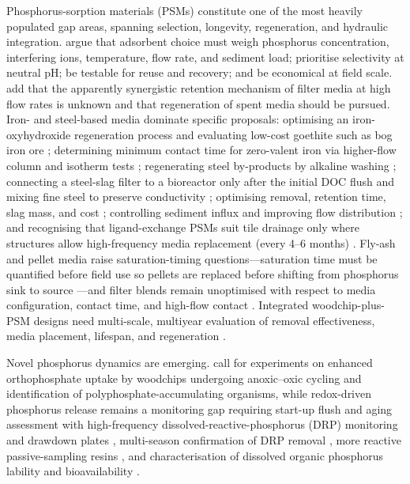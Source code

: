 Phosphorus-sorption materials (PSMs) constitute one of the most heavily populated
gap areas, spanning selection, longevity, regeneration, and hydraulic
integration. \textcite{Li2020} argue that adsorbent choice must weigh phosphorus
concentration, interfering ions, temperature, flow rate, and sediment load;
prioritise selectivity at neutral pH; be testable for reuse and recovery; and be
economical at field scale. \textcite{Mendes2022} add that the apparently
synergistic retention mechanism of filter media at high flow rates is unknown and
that regeneration of spent media should be pursued. Iron- and steel-based media
dominate specific proposals: optimising an iron-oxyhydroxide regeneration process
and evaluating low-cost goethite such as bog iron ore \parencite{Allred2017};
determining minimum contact time for zero-valent iron via higher-flow column and
isotherm tests \parencite{Allred2014}; regenerating steel by-products by alkaline
washing \parencite{Hua2016}; connecting a steel-slag filter to a bioreactor only
after the initial DOC flush and mixing fine steel to preserve conductivity
\parencite{Sellner2019b}; optimising removal, retention time, slag mass, and cost
\parencite{Wang2020d}; controlling sediment influx and improving flow
distribution \parencite{Shedekar2020}; and recognising that ligand-exchange PSMs
suit tile drainage only where structures allow high-frequency media replacement
(every 4--6 months) \parencite{Penn2020}. Fly-ash and pellet media raise
saturation-timing questions---saturation time must be quantified before field use
so pellets are replaced before shifting from phosphorus sink to source
\parencite{Li2017,Li2018b}---and filter blends remain unoptimised with respect to
media configuration, contact time, and high-flow contact
\parencite{Agrawal2011,Agrawal2011b,Kumari2025,Kankarej2023}. Integrated
woodchip-plus-PSM designs need multi-scale, multiyear evaluation of removal
effectiveness, media placement, lifespan, and regeneration \parencite{Husk2018}.

Novel phosphorus dynamics are emerging. \textcite{Zhang2024b} call for
experiments on enhanced orthophosphate uptake by woodchips undergoing
anoxic--oxic cycling and identification of polyphosphate-accumulating organisms,
while redox-driven phosphorus release remains a monitoring gap requiring start-up
flush and aging assessment with high-frequency dissolved-reactive-phosphorus
(DRP) monitoring and drawdown plates \parencite{Bailon2025}, multi-season
confirmation of DRP removal \parencite{Rivas2020}, more reactive passive-sampling
resins \parencite{Li2020b}, and characterisation of dissolved organic phosphorus
lability and bioavailability \parencite{Liu2024b}.


